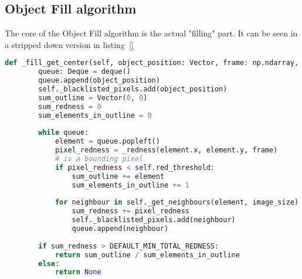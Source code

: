 \subsection{Object Fill algorithm}\label{solution:objfillalgo}

The core of the Object Fill algorithm is the actual "filling" part.
It can be seen in a stripped down version in listing~\ref{}

\begin{lstlisting}[language=Python,label={lst:threshmoment},caption={Stripped version of thresh moment from thresh\_moment.py}]
    def _fill_get_center(self, object_position: Vector, frame: np.ndarray, image_size: Vector) -> Optional[Vector]:
	    queue: Deque = deque()
	    queue.append(object_position)
	    self._blacklisted_pixels.add(object_position)
	    sum_outline = Vector(0, 0)
	    sum_redness = 0
	    sum_elements_in_outline = 0
	    
	    while queue:
		    element = queue.popleft()
		    pixel_redness = _redness(element.x, element.y, frame)
		    # is a bounding pixel
		    if pixel_redness < self.red_threshold:
			    sum_outline += element
			    sum_elements_in_outline += 1
		    
		    for neighbour in self._get_neighbours(element, image_size) - self._blacklisted_pixels:
			    sum_redness += pixel_redness
			    self._blacklisted_pixels.add(neighbour)
			    queue.append(neighbour)
	    
	    if sum_redness > DEFAULT_MIN_TOTAL_REDNESS:
		    return sum_outline / sum_elements_in_outline
	    else:
		    return None
\end{lstlisting}